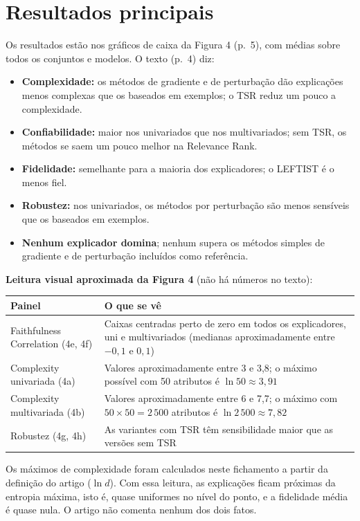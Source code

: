 \documentclass[11pt,a4paper]{article}
\begin{document}
\section{Resultados principais}
Os resultados estão nos gráficos de caixa da Figura 4 (p.~5), com médias sobre todos os conjuntos e modelos. O texto (p.~4) diz:
\begin{itemize}
\item \textbf{Complexidade:} os métodos de gradiente e de perturbação dão explicações menos complexas que os baseados em exemplos; o TSR reduz um pouco a complexidade.
\item \textbf{Confiabilidade:} maior nos univariados que nos multivariados; sem TSR, os métodos se saem um pouco melhor na Relevance Rank.
\item \textbf{Fidelidade:} semelhante para a maioria dos explicadores; o LEFTIST é o menos fiel.
\item \textbf{Robustez:} nos univariados, os métodos por perturbação são menos sensíveis que os baseados em exemplos.
\item \textbf{Nenhum explicador domina}; nenhum supera os métodos simples de gradiente e de perturbação incluídos como referência.
\end{itemize}
\textbf{Leitura visual aproximada da Figura 4} (não há números no texto):
\begin{center}\small
\begin{tabularx}{\linewidth}{lX}
\toprule
\textbf{Painel} & \textbf{O que se vê} \\
\midrule
Faithfulness Correlation (4e, 4f) & Caixas centradas perto de zero em todos os explicadores, uni e multivariados (medianas aproximadamente entre $-0{,}1$ e $0{,}1$) \\
Complexity univariada (4a) & Valores aproximadamente entre 3 e 3,8; o máximo possível com 50 atributos é $\ln 50 \approx 3{,}91$ \\
Complexity multivariada (4b) & Valores aproximadamente entre 6 e 7,7; o máximo com $50 \times 50 = 2\,500$ atributos é $\ln 2\,500 \approx 7{,}82$ \\
Robustez (4g, 4h) & As variantes com TSR têm sensibilidade maior que as versões sem TSR \\
\bottomrule
\end{tabularx}
\end{center}
Os máximos de complexidade foram calculados neste fichamento a partir da definição do artigo ($\ln d$). Com essa leitura, as explicações ficam próximas da entropia máxima, isto é, quase uniformes no nível do ponto, e a fidelidade média é quase nula. O artigo não comenta nenhum dos dois fatos.
\end{document}
